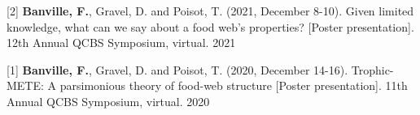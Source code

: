
\begin{cventries}

  \cventry
    {[2] \textbf{Banville, F.}, Gravel, D. and Poisot, T. (2021, December 8-10). Given limited knowledge, what can we say about a food web’s properties? [Poster presentation]. 12th Annual QCBS Symposium, virtual.}
    {} {} {2021} 
    {
      \begin{cvitems} %
      \end{cvitems}
    }

  \cventry
    {[1] \textbf{Banville, F.}, Gravel, D. and Poisot, T. (2020, December 14-16). Trophic-METE: A parsimonious theory of food-web structure [Poster presentation]. 11th Annual QCBS Symposium, virtual.}
    {} {} {2020} 
    {
      \begin{cvitems} %
      \end{cvitems}
    }

\end{cventries}

